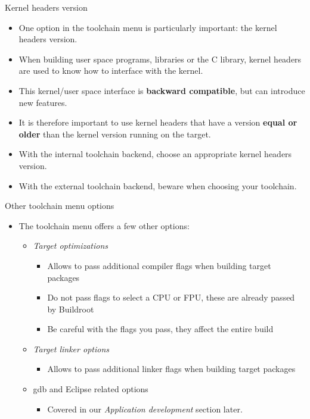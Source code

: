 \begin{frame}{Kernel headers version}
  \begin{itemize}
  \item One option in the toolchain menu is particularly important:
    the kernel headers version.
  \item When building user space programs, libraries or the C library,
    kernel headers are used to know how to interface with the kernel.
  \item This kernel/user space interface is {\bf backward compatible},
    but can introduce new features.
  \item It is therefore important to use kernel headers that have a
    version {\bf equal or older} than the kernel version running on
    the target.
  \item With the internal toolchain backend, choose an appropriate
    kernel headers version.
  \item With the external toolchain backend, beware when choosing your
    toolchain.
  \end{itemize}
\end{frame}

\begin{frame}{Other toolchain menu options}
  \begin{itemize}
  \item The toolchain menu offers a few other options:
    \begin{itemize}
    \item {\em Target optimizations}
      \begin{itemize}
      \item Allows to pass additional compiler flags when building
        target packages
      \item Do not pass flags to select a CPU or FPU, these are
        already passed by Buildroot
      \item Be careful with the flags you pass, they affect the entire
        build
      \end{itemize}
    \item {\em Target linker options}
      \begin{itemize}
      \item Allows to pass additional linker flags when building
        target packages
      \end{itemize}
    \item gdb and Eclipse related options
      \begin{itemize}
      \item Covered in our {\em Application development} section later.
      \end{itemize}
    \end{itemize}
  \end{itemize}
\end{frame}
